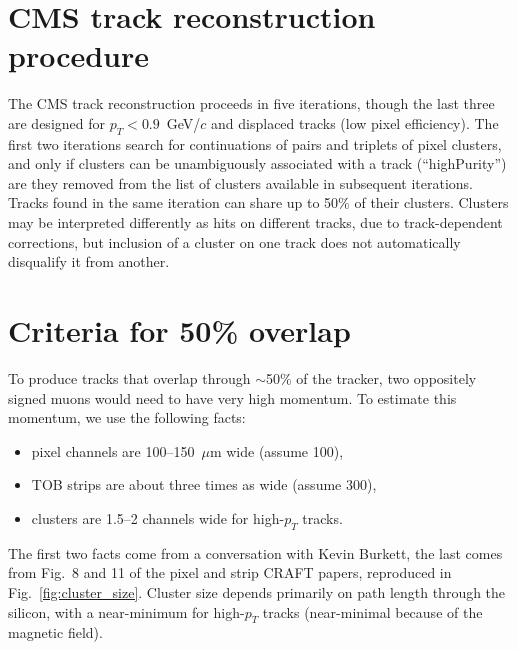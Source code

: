 \documentclass[12pt]{article}
\begin{document}
\section{CMS track reconstruction procedure}

The CMS track reconstruction proceeds in five iterations, though the
last three are designed for $p_T < 0.9$~GeV/$c$ and displaced tracks
(low pixel efficiency).  The first two iterations search for
continuations of pairs and triplets of pixel clusters, and only if
clusters can be unambiguously associated with a track (``highPurity'')
are they removed from the list of clusters available in subsequent
iterations.  Tracks found in the same iteration can share up to 50\%
of their clusters.  Clusters may be interpreted differently as hits on
different tracks, due to track-dependent corrections, but inclusion of
a cluster on one track does not automatically disqualify it from
another.

\section{Criteria for 50\% overlap}

To produce tracks that overlap through $\sim$50\% of the tracker, two
oppositely signed muons would need to have very high momentum.  To
estimate this momentum, we use the following facts:
\begin{itemize}
\item pixel channels are 100--150~$\mu$m wide (assume 100),
\item TOB strips are about three times as wide (assume 300),
\item clusters are 1.5--2 channels wide for high-$p_T$ tracks.
\end{itemize}
The first two facts come from a conversation with Kevin Burkett, the
last comes from Fig.~8 and 11 of the pixel and strip CRAFT papers,
reproduced in Fig.~\ref{fig:cluster_size}.  Cluster size depends
primarily on path length through the silicon, with a near-minimum for
high-$p_T$ tracks (near-minimal because of the magnetic field).
\end{document}
